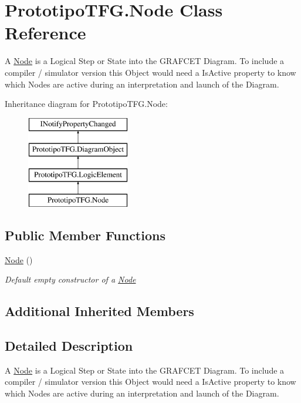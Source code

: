 \hypertarget{class_prototipo_t_f_g_1_1_node}{}\section{Prototipo\+T\+F\+G.\+Node Class Reference}
\label{class_prototipo_t_f_g_1_1_node}


A \hyperlink{class_prototipo_t_f_g_1_1_node}{Node} is a Logical Step or State into the G\+R\+A\+F\+C\+E\+T Diagram. To include a compiler / simulator version this Object would need a \textquotesingle{}Is\+Active\textquotesingle{} property to know which Nodes are active during an interpretation and launch of the Diagram.  


Inheritance diagram for Prototipo\+T\+F\+G.\+Node\+:\begin{figure}[H]
\begin{center}
\leavevmode
\includegraphics[height=4.000000cm]{class_prototipo_t_f_g_1_1_node}
\end{center}
\end{figure}
\subsection*{Public Member Functions}
\begin{DoxyCompactItemize}
\item 
\hyperlink{class_prototipo_t_f_g_1_1_node_adddb9c60a669d30500829a2f2b7c4d96}{Node} ()
\begin{DoxyCompactList}\small\item\em Default empty constructor of a \hyperlink{class_prototipo_t_f_g_1_1_node}{Node} \end{DoxyCompactList}\end{DoxyCompactItemize}
\subsection*{Additional Inherited Members}


\subsection{Detailed Description}
A \hyperlink{class_prototipo_t_f_g_1_1_node}{Node} is a Logical Step or State into the G\+R\+A\+F\+C\+E\+T Diagram. To include a compiler / simulator version this Object would need a \textquotesingle{}Is\+Active\textquotesingle{} property to know which Nodes are active during an interpretation and launch of the Diagram. 



